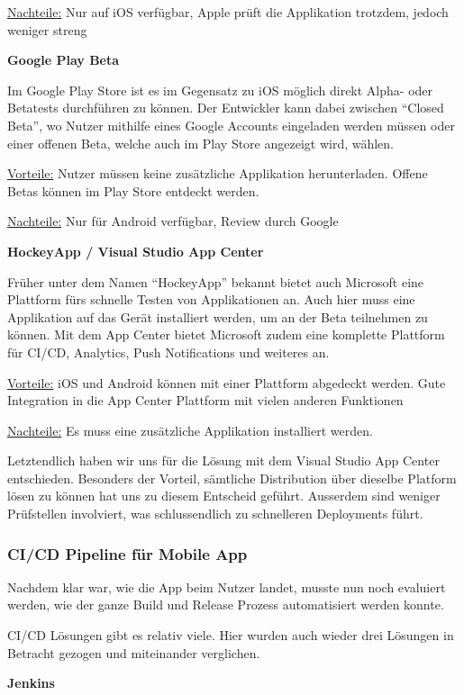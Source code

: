 \underline{Nachteile:} Nur auf iOS verfügbar, Apple prüft die Applikation trotzdem, jedoch weniger streng

\textbf{Google Play Beta}

Im Google Play Store ist es im Gegensatz zu iOS möglich direkt Alpha- oder Betatests durchführen zu können. Der Entwickler kann dabei zwischen ``Closed Beta'', wo Nutzer mithilfe eines Google Accounts eingeladen werden müssen oder einer offenen Beta, welche auch im Play Store angezeigt wird, wählen.

\underline{Vorteile:} Nutzer müssen keine zusätzliche Applikation herunterladen. Offene Betas können im Play Store entdeckt werden.

\underline{Nachteile:} Nur für Android verfügbar, Review durch Google

\textbf{HockeyApp / Visual Studio App Center}

Früher unter dem Namen ``HockeyApp'' bekannt bietet auch Microsoft eine Plattform fürs schnelle Testen von Applikationen an. Auch hier muss eine Applikation auf das Gerät installiert werden, um an der Beta teilnehmen zu können. Mit dem App Center bietet Microsoft zudem eine komplette Plattform für CI/CD, Analytics, Push Notifications und weiteres an.

\underline{Vorteile:} iOS und Android können mit einer Plattform abgedeckt werden. Gute Integration in die App Center Plattform mit vielen anderen Funktionen

\underline{Nachteile:} Es muss eine zusätzliche Applikation installiert werden.

Letztendlich haben wir uns für die Lösung mit dem Visual Studio App Center entschieden. Besonders der Vorteil, sämtliche Distribution über dieselbe Platform lösen zu können hat uns zu diesem Entscheid geführt. Ausserdem sind weniger Prüfstellen involviert, was schlussendlich zu schnelleren Deployments führt.

\subsubsection{CI/CD Pipeline für Mobile App}
Nachdem klar war, wie die App beim Nutzer landet, musste nun noch evaluiert werden, wie der ganze Build und Release Prozess automatisiert werden konnte. 

CI/CD Lösungen gibt es relativ viele. Hier wurden auch wieder drei Lösungen in Betracht gezogen und miteinander verglichen.

\textbf{Jenkins}

